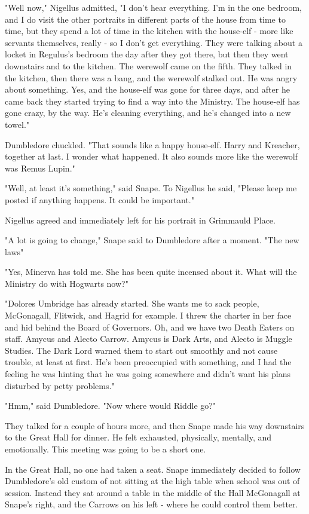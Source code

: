 "Well now," Nigellus admitted, "I don't hear everything. I'm in the one bedroom, and I do visit the other portraits in different parts of the house from time to time, but they spend a lot of time in the kitchen with the house-elf - more like servants themselves, really - so I don't get everything. They were talking about a locket in Regulus's bedroom the day after they got there, but then they went downstairs and to the kitchen. The werewolf came on the fifth. They talked in the kitchen, then there was a bang, and the werewolf stalked out. He was angry about something. Yes, and the house-elf was gone for three days, and after he came back they started trying to find a way into the Ministry. The house-elf has gone crazy, by the way. He's cleaning everything, and he's changed into a new towel."

Dumbledore chuckled. "That sounds like a happy house-elf. Harry and Kreacher, together at last. I wonder what happened. It also sounds more like the werewolf was Remus Lupin."

"Well, at least it's something," said Snape. To Nigellus he said, "Please keep me posted if anything happens. It could be important."

Nigellus agreed and immediately left for his portrait in Grimmauld Place.

"A lot is going to change," Snape said to Dumbledore after a moment. "The new laws{\el}"

"Yes, Minerva has told me. She has been quite incensed about it. What will the Ministry do with Hogwarts now?"

"Dolores Umbridge has already started. She wants me to sack people, McGonagall, Flitwick, and Hagrid for example. I threw the charter in her face and hid behind the Board of Governors. Oh, and we have two Death Eaters on staff. Amycus and Alecto Carrow. Amycus is Dark Arts, and Alecto is Muggle Studies. The Dark Lord warned them to start out smoothly and not cause trouble, at least at first. He's been preoccupied with something, and I had the feeling he was hinting that he was going somewhere and didn't want his plans disturbed by petty problems."

"Hmm," said Dumbledore. "Now where would Riddle go?"

They talked for a couple of hours more, and then Snape made his way downstairs to the Great Hall for dinner. He felt exhausted, physically, mentally, and emotionally. This meeting was going to be a short one.

In the Great Hall, no one had taken a seat. Snape immediately decided to follow Dumbledore's old custom of not sitting at the high table when school was out of session. Instead they sat around a table in the middle of the Hall McGonagall at Snape's right, and the Carrows on his left - where he could control them better.

